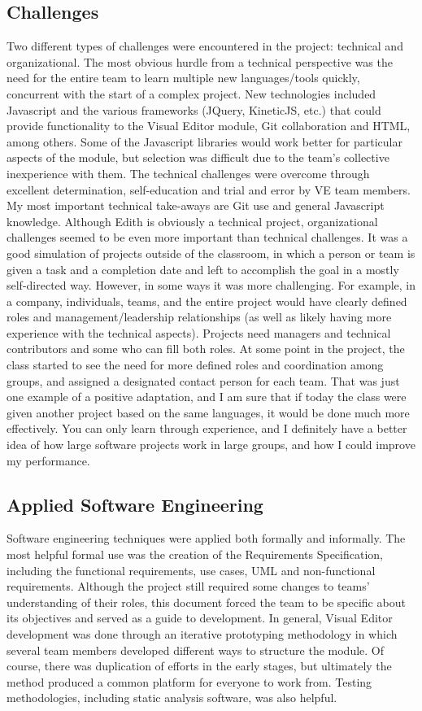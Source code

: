 \documentclass[a4paper]{article}
\begin{document}
\subsection{Challenges}
Two different types of challenges were encountered in the project: technical and organizational. The most obvious hurdle from a technical perspective was the need for the entire team to learn multiple new languages/tools quickly, concurrent with the start of a complex project. New technologies included Javascript and the various frameworks (JQuery, KineticJS, etc.) that could provide functionality to the Visual Editor module, Git collaboration and HTML, among others. Some of the Javascript libraries would work better for particular aspects of the module, but selection was difficult due to the team's collective inexperience with them. The technical challenges were overcome through excellent determination, self-education and trial and error by VE team members. My most important technical take-aways are Git use and general Javascript knowledge.
Although Edith is obviously a technical project, organizational challenges seemed to be even more important than technical challenges. It was a good simulation of projects outside of the classroom, in which a person or team is given a task and a completion date and left to accomplish the goal in a mostly self-directed way. However, in some ways it was more challenging. For example, in a company, individuals, teams, and the entire project would have clearly defined roles and management/leadership relationships (as well as likely having more experience with the technical aspects). Projects need managers and technical contributors and some who can fill both roles. At some point in the project, the class started to see the need for more defined roles and coordination among groups, and assigned a designated contact person for each team. That was just one example of a positive adaptation, and I am sure that if today the class were given another project based on the same languages, it would be done much more effectively. You can only learn through experience, and I definitely have a better idea of how large software projects work in large groups, and how I could improve my performance.
\subsection{Applied Software Engineering}
Software engineering techniques were applied both formally and informally. The most helpful formal use was the creation of the Requirements Specification, including the functional requirements, use cases, UML and non-functional requirements. Although the project still required some changes to teams' understanding of their roles, this document forced the team to be specific about its objectives and served as a guide to development. In general, Visual Editor development was done through an iterative prototyping methodology in which several team members developed different ways to structure the module. Of course, there was duplication of efforts in the early stages, but ultimately the method produced a common platform for everyone to work from. Testing methodologies, including static analysis software, was also helpful. 
\end{document}
